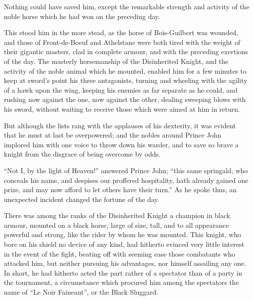 Nothing could have saved him, except the remarkable strength and
activity of the noble horse which he had won on the preceding day.

This stood him in the more stead, as the horse of Bois-Guilbert was
wounded, and those of Front-de-Boeuf and Athelstane were both tired with
the weight of their gigantic masters, clad in complete armour, and with
the preceding exertions of the day. The masterly horsemanship of the
Disinherited Knight, and the activity of the noble animal which he
mounted, enabled him for a few minutes to keep at sword's point his
three antagonists, turning and wheeling with the agility of a hawk upon
the wing, keeping his enemies as far separate as he could, and rushing
now against the one, now against the other, dealing sweeping blows with
his sword, without waiting to receive those which were aimed at him in
return.

But although the lists rang with the applauses of his dexterity, it was
evident that he must at last be overpowered; and the nobles around
Prince John implored him with one voice to throw down his warder, and to
save so brave a knight from the disgrace of being overcome by odds.

``Not I, by the light of Heaven!'' answered Prince John; ``this same
springald, who conceals his name, and despises our proffered
hospitality, hath already gained one prize, and may now afford to let
others have their turn.'' As he spoke thus, an unexpected incident
changed the fortune of the day.

There was among the ranks of the Disinherited Knight a champion in black
armour, mounted on a black horse, large of size, tall, and to all
appearance powerful and strong, like the rider by whom he was mounted.
This knight, who bore on his shield no device of any kind, had hitherto
evinced very little interest in the event of the fight, beating off with
seeming ease those combatants who attacked him, but neither pursuing his
advantages, nor himself assailing any one. In short, he had hitherto
acted the part rather of a spectator than of a party in the tournament,
a circumstance which procured him among the spectators the name of ``Le
Noir Faineant'', or the Black Sluggard.

